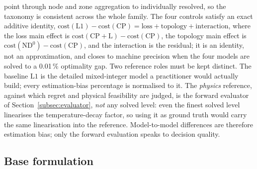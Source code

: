 \documentclass[a4paper,fleqn]{cas-sc}
\newcommand{\CP}{\ensuremath{\mathrm{CP}}}      %
\newcommand{\CPL}{\ensuremath{\mathrm{CP{+}L}}} %
\newcommand{\NDz}{\ensuremath{\mathrm{ND^{0}}}} %
\newcommand{\Lone}{\ensuremath{\mathrm{L1}}}    %
\newcommand{\new}[1]{\textcolor[HTML]{1A5FB4}{#1}}   %
\newcommand{\new}[1]{#1}
\begin{document}
point through node and zone aggregation to individually resolved, so the taxonomy is consistent
across the whole family. The four controls satisfy an exact additive identity,
$\text{cost}(\Lone)-\text{cost}(\CP)=\text{loss}+\text{topology}+\text{interaction}$, where the
loss main effect is $\text{cost}(\CPL)-\text{cost}(\CP)$, the topology main effect is
$\text{cost}(\NDz)-\text{cost}(\CP)$, and the interaction is the residual; it is an identity,
not an approximation, and closes to machine precision when the four models are solved to a
0.01\,\% optimality gap.
Two reference roles must be kept distinct. The baseline $\Lone$ is the detailed
mixed-integer model a practitioner would actually build; every estimation-bias percentage is
normalised to it. The \emph{physics} reference, against which regret and physical feasibility
are judged, is the forward evaluator of Section~\ref{subsec:evaluator}, \emph{not} any solved
level: even the finest solved level linearises the temperature-decay factor, so using it as
ground truth would carry the same linearisation into the reference. Model-to-model differences
are therefore estimation bias; only the forward evaluation speaks to decision quality.

\subsection{Base formulation}
\new{}
\end{document}
